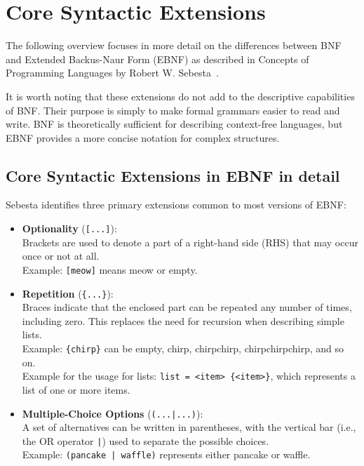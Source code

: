 \section{Core Syntactic Extensions}

The following overview focuses in more detail on the differences between BNF and Extended Backus-Naur Form (EBNF) as described in Concepts of Programming Languages by Robert W. Sebesta~\cite[pp.~149-151]{SebestaConceptsEdition}.

It is worth noting that these extensions do not add to the descriptive capabilities of BNF. Their purpose is simply to make formal grammars easier to read and write. BNF is theoretically sufficient for describing context-free languages, but EBNF provides a more concise notation for complex structures.

\subsection{Core Syntactic Extensions in EBNF in detail}

Sebesta identifies three primary extensions common to most versions of EBNF:

\begin{itemize}
    \item \textbf{Optionality} (\texttt{[...]}): \\
    Brackets are used to denote a part of a right-hand side (RHS) that may occur once or not at all. \\
    Example: \texttt{[meow]} means meow or empty.
    
    \item \textbf{Repetition} (\texttt{\{...\}}): \\
    Braces indicate that the enclosed part can be repeated any number of times, including zero. This replaces the need for recursion when describing simple lists. \\
    Example: \texttt{\{chirp\}} can be empty, chirp, chirpchirp, chirpchirpchirp, and so on. \\
    Example for the usage for lists: \texttt{list = <item> \{<item>\}}, which represents a list of one or more items.
    
    \item \textbf{Multiple-Choice Options} (\texttt{(...|...)}): \\
    A set of alternatives can be written in parentheses, with the vertical bar (i.e., the OR operator \texttt{|}) used to separate the possible choices. \\
    Example: \texttt{(pancake | waffle)} represents either pancake or waffle.
\end{itemize}

